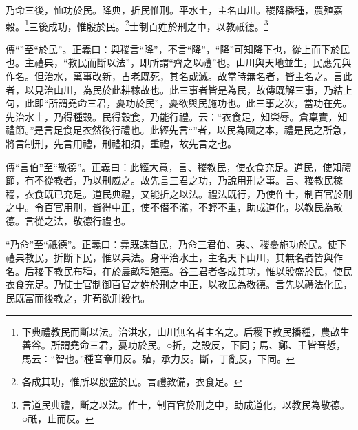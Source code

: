 乃命三後，恤功於民。降典，折民惟刑。平水土，主名山川。稷降播種，農殖嘉穀。\footnote{下典禮教民而斷以法。治洪水，山川無名者主名之。后稷下教民播種，農畝生善谷。所謂堯命三君，憂功於民。○折，之設反，下同；馬、鄭、王皆音悊，馬云：“智也。”種音章用反。殖，承力反。斷，丁亂反，下同。}三後成功，惟殷於民。\footnote{各成其功，惟所以殷盛於民。言禮教備，衣食足。}士制百姓於刑之中，以教祇德。\footnote{言道民典禮，斷之以法。作士，制百官於刑之中，助成道化，以教民為敬德。○祇，止而反。}


{\noindent\zhuan{}\fzbyks 傳“”至“於民”。正義曰：與稷言“降”，不言“降”，“降”可知降下也，從上而下於民也。主禮典，“教民而斷以法”，即所謂“齊之以禮”也。山川與天地並生，民應先與作名。但治水，萬事改新，古老既死，其名或滅。故當時無名者，皆主名之。言此者，以見治山川，為民於此耕稼故也。此三事者皆是為民，故傳既解三事，乃結上句，此即“所謂堯命三君，憂功於民”，憂欲與民施功也。此三事之次，當功在先。先治水土，乃得種穀。民得穀食，乃能行禮。云：“衣食足，知榮辱。倉稟實，知禮節。”是言足食足衣然後行禮也。此經先言“”者，以民為國之本，禮是民之所急，將言制刑，先言用禮，刑禮相須，重禮，故先言之也。 \par}

{\noindent\zhuan{}\fzbyks 傳“言伯”至“敬德”。正義曰：此經大意，言、稷教民，使衣食充足。道民，使知禮節，有不從教者，乃以刑威之。故先言三君之功，乃說用刑之事。言、稷教民稼穡，衣食既已充足。道民典禮，又能折之以法。禮法既行，乃使作士，制百官於刑之中。令百官用刑，皆得中正，使不僣不濫，不輕不重，助成道化，以教民為敬德。言從之法，敬德行禮也。 \par}

{\noindent\shu{}\fzkt “乃命”至“祇德”。正義曰：堯既誅苗民，乃命三君伯、夷、、稷憂施功於民。使下禮典教民，折斷下民，惟以典法。身平治水土，主名天下山川，其無名者皆與作名。后稷下教民布種，在於農畝種殖嘉。谷三君者各成其功，惟以殷盛於民，使民衣食充足。乃使士官制御百官之姓於刑之中正，以教民為敬德。言先以禮法化民，民既富而後教之，非苟欲刑殺也。 \par}

